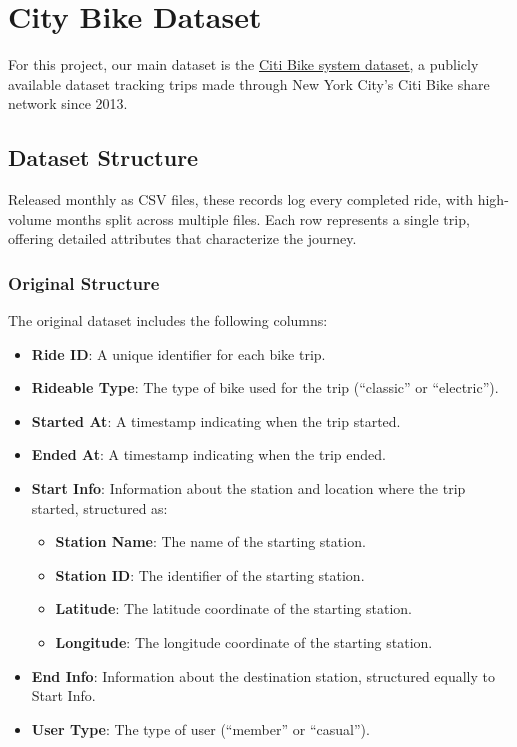 \section{City Bike Dataset}
For this project, our main dataset is the \href{https://www.citibikenyc.com/system-data}{\underline{Citi Bike system dataset}}, a publicly available dataset tracking trips made through New York City's Citi Bike share network since 2013.

\subsection{Dataset Structure}
Released monthly as CSV files, these records log every completed ride, with high-volume months split across multiple files.
Each row represents a single trip, offering detailed attributes that characterize the journey.

\subsubsection{Original Structure}
The original dataset includes the following columns:
\begin{itemize}
    \item \textbf{Ride ID}: A unique identifier for each bike trip.
    \item \textbf{Rideable Type}: The type of bike used for the trip (``classic'' or ``electric'').
    \item \textbf{Started At}: A timestamp indicating when the trip started.
    \item \textbf{Ended At}: A timestamp indicating when the trip ended.
    \item \textbf{Start Info}: Information about the station and location where the trip started, structured as:
          \begin{itemize}
              \item \textbf{Station Name}: The name of the starting station.
              \item \textbf{Station ID}: The identifier of the starting station.
              \item \textbf{Latitude}: The latitude coordinate of the starting station.
              \item \textbf{Longitude}: The longitude coordinate of the starting station.
          \end{itemize}
    \item \textbf{End Info}: Information about the destination station, structured equally to Start Info.
    \item \textbf{User Type}: The type of user (``member'' or ``casual'').
\end{itemize}

